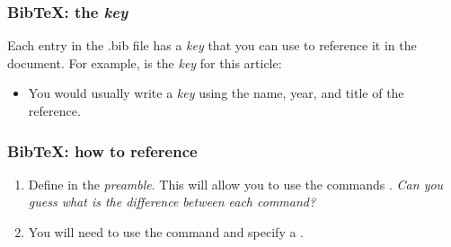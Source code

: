 \begin{frame}[fragile]
\frametitle{BibTeX: the \textit{key}}
Each entry in the .bib file has a \textit{key} that you can use to reference it in the document. For example,
\color{red}{Jacobson1999Towards} \color{black}{} is the \textit{key} for this article:
\begin{framed}
\begin{verbnobox}[\vbdelim]
@Article<{>Jacobson1999Towards,
author = <{>Van Jacobson<}>,
...
\end{verbnobox}
\end{framed}

\begin{itemize}
\item You would usually write a \textit{key} using the name, year, and title of the reference. \\
\end{itemize}
\end{frame}

\begin{frame}[fragile]
\frametitle{BibTeX: how to reference}

\begin{enumerate}
\item Define \color{blue}{\verb|\usepackage{natbib}|} \color{black}{} in the \textit{preamble}. This will allow you to use the commands \color{blue}{\verb|\citet|} \color{black}{and} 
\color{blue}{\verb|\citep|} \color{black}{}. \textit{Can you guess what is the difference between each command?}\\
\item You will need to use the command \color{blue}{\verb||} \color{black}{} and specify a  \color{blue}{\verb||} \color{black}{}. \\
\end{enumerate}

\begin{framed}
\end{framed}
\end{frame} 

